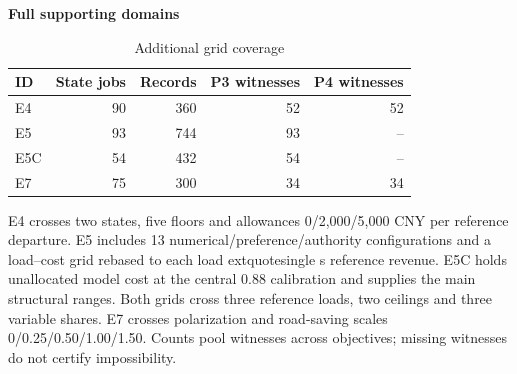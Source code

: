 \begin{table}[htbp]\centering
\caption{Additional grid coverage}\label{tab:review_appendix_design}
\begin{minipage}{.95\textwidth}\fontsize{8}{10}\selectfont{}\setlength{\tabcolsep}{2pt}\renewcommand{\arraystretch}{1.08}
\par\noindent\textbf{Full supporting domains}\par\smallskip
\begin{tabular*}{\linewidth}{@{\extracolsep{\fill}}lrrrr@{}}\toprule
ID & State jobs & Records & P3 witnesses & P4 witnesses \\
\midrule
E4 & 90 & 360 & 52 & 52 \\
E5 & 93 & 744 & 93 & -- \\
E5C & 54 & 432 & 54 & -- \\
E7 & 75 & 300 & 34 & 34 \\
\bottomrule\end{tabular*}\par\medskip
\par\noindent\fontsize{8}{9.5}\selectfont E4 crosses two states, five floors and allowances 0/2,000/5,000 CNY per reference departure. E5 includes 13 numerical/preference/authority configurations and a load--cost grid rebased to each load	extquotesingle s reference revenue. E5C holds unallocated model cost at the central 0.88 calibration and supplies the main structural ranges. Both grids cross three reference loads, two ceilings and three variable shares. E7 crosses polarization and road-saving scales 0/0.25/0.50/1.00/1.50. Counts pool witnesses across objectives; missing witnesses do not certify impossibility.
\end{minipage}\end{table}
